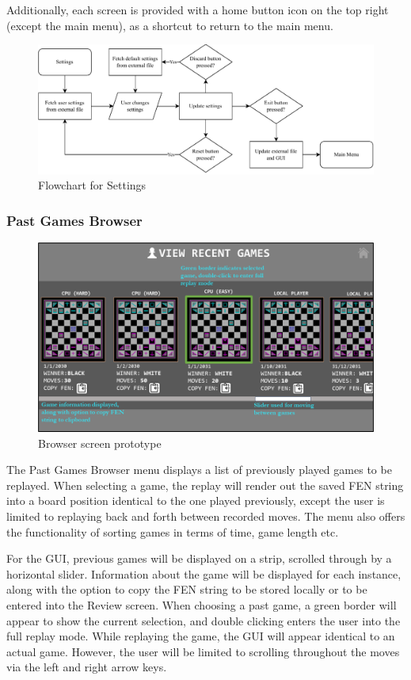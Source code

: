 \documentclass[../main/main.tex]{subfiles}
\begin{document}
Additionally, each screen is provided with a home button icon on the top right (except the main menu), as a shortcut to return to the main menu.

\begin{figure}[H]
    \centering
    \includegraphics[width=\columnwidth]{../design/assets/settings_flowchart.pdf}
    \caption{Flowchart for Settings}
    \label{fig:settings-flowchart}
\end{figure}

\subsubsection{Past Games Browser}
\begin{figure}[H]
    \centering
    \includegraphics[width=0.8\columnwidth]{../design/assets/browser_gui.png}
    \caption{Browser screen prototype}
    \label{fig:browser-gui}
\end{figure}

The Past Games Browser menu displays a list of previously played games to be replayed. When selecting a game, the replay will render out the saved FEN string into a board position identical to the one played previously, except the user is limited to replaying back and forth between recorded moves. The menu also offers the functionality of sorting games in terms of time, game length etc.

For the GUI, previous games will be displayed on a strip, scrolled through by a horizontal slider. Information about the game will be displayed for each instance, along with the option to copy the FEN string to be stored locally or to be entered into the Review screen. When choosing a past game, a green border will appear to show the current selection, and double clicking enters the user into the full replay mode.
While replaying the game, the GUI will appear identical to an actual game. However, the user will be limited to scrolling throughout the moves via the left and right arrow keys.
\end{document}
